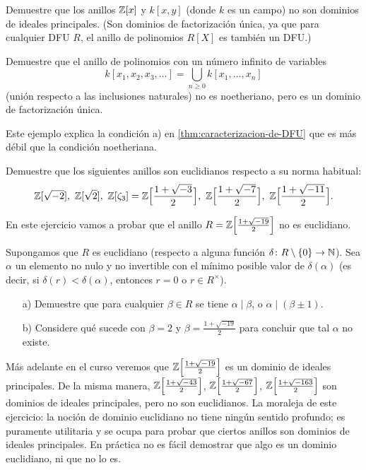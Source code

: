 \begin{ejercicio}
  Demuestre que los anillos $\mathbb{Z} [x]$ y $k [x,y]$ (donde $k$ es un campo) no son
  dominios de ideales principales. (Son dominios de factorización única, ya que
  para cualquier DFU $R$, el anillo de polinomios $R[X]$ es también un DFU.)
\end{ejercicio}

\begin{ejercicio}
  Demuestre que el anillo de polinomios con un número infinito de variables
  $$k [x_1,x_2,x_3,\ldots] = \bigcup_{n\ge 0} k [x_1,\ldots,x_n]$$
  (unión respecto a las inclusiones naturales) no es noetheriano, pero es un
  dominio de factorización única.

  Este ejemplo explica la condición a) en \ref{thm:caracterizacion-de-DFU} que
  es más débil que la condición noetheriana.
\end{ejercicio}

\begin{ejercicio}
  Demuestre que los siguientes anillos son euclidianos respecto a su norma
  habitual:
  \[ \mathbb{Z} [\sqrt{-2}], ~ \mathbb{Z} [\sqrt{2}], ~
     \mathbb{Z} [\zeta_3] = \mathbb{Z} \Bigl[\frac{1+\sqrt{-3}}{2}\Bigr], ~
     \mathbb{Z} \Bigl[\frac{1+\sqrt{-7}}{2}\Bigr], ~
     \mathbb{Z} \Bigl[\frac{1+\sqrt{-11}}{2}\Bigr]. \]
\end{ejercicio}

\begin{ejercicio}
  En este ejercicio vamos a probar que el anillo
  $R = \mathbb{Z} \Bigl[\frac{1+\sqrt{-19}}{2}\Bigr]$ no es euclidiano.

  Supongamos que $R$ es euclidiano (respecto a alguna función
  $\delta\colon R\setminus \{0\} \to \mathbb{N}$). Sea $\alpha$ un elemento no nulo
  y no invertible con el mínimo posible valor de $\delta (\alpha)$
  (es decir, si $\delta (r) < \delta (\alpha)$, entonces $r = 0$ o
  $r \in R^\times$).

  \begin{enumerate}
  \item[a)] Demuestre que para cualquier $\beta \in R$ se tiene
    $\alpha \mid \beta$, o $\alpha \mid (\beta \pm 1)$.

  \item[b)] Considere qué sucede con $\beta = 2$ y
    $\beta = \frac{1+\sqrt{-19}}{2}$ para concluir que tal $\alpha$ no existe.
  \end{enumerate}

  Más adelante en el curso veremos que $\mathbb{Z} \Bigl[\frac{1+\sqrt{-19}}{2}\Bigr]$
  es un dominio de ideales principales. De la misma manera,
  $\mathbb{Z} \Bigl[\frac{1+\sqrt{-43}}{2}\Bigr]$,
  $\mathbb{Z} \Bigl[\frac{1+\sqrt{-67}}{2}\Bigr]$,
  $\mathbb{Z} \Bigl[\frac{1+\sqrt{-163}}{2}\Bigr]$
  son dominios de ideales principales, pero no son euclidianos. La moraleja de
  este ejercicio: la noción de dominio euclidiano no tiene ningún sentido
  profundo; es puramente utilitaria y se ocupa para probar que ciertos anillos
  son dominios de ideales principales. En práctica no es fácil demostrar que
  algo es un dominio euclidiano, ni que no lo es.
\end{ejercicio}

